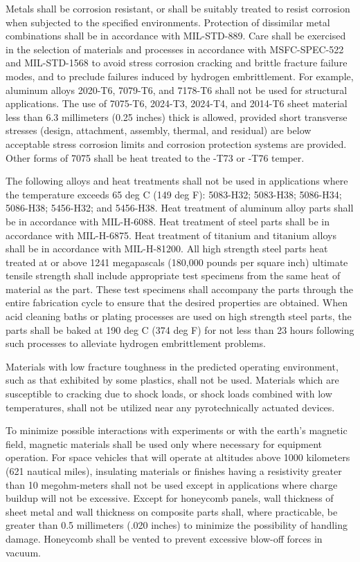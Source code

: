 \documentclass[12pt]{article}
\begin{document}
Metals shall be corrosion resistant, or shall be suitably treated to resist corrosion when subjected to the specified environments. 
Protection of dissimilar metal combinations shall be in accordance with MIL-STD-889. 
Care shall be exercised in the selection of materials and processes in accordance with MSFC-SPEC-522 and MIL-STD-1568 to avoid stress corrosion cracking and brittle fracture failure modes, and to preclude failures induced by hydrogen embrittlement. 
For example, aluminum alloys 2020-T6, 7079-T6, and 7178-T6 shall not be used for structural applications. 
The use of 7075-T6, 2024-T3, 2024-T4, and 2014-T6 sheet material less than 6.3 millimeters (0.25 inches) thick is allowed, provided short transverse stresses (design, attachment, assembly, thermal, and residual) are below acceptable stress corrosion limits and corrosion protection systems are provided. 
Other forms of 7075 shall be heat treated to the -T73 or -T76 temper.

The following alloys and heat treatments shall not be used in applications where the temperature exceeds 65 deg C (149 deg F): 5083-H32; 5083-H38; 5086-H34; 5086-H38; 5456-H32; and 5456-H38. 
Heat treatment of aluminum alloy parts shall be in accordance with MIL-H-6088. 
Heat treatment of steel parts shall be in accordance with MIL-H-6875. 
Heat treatment of titanium and titanium alloys shall be in accordance with MIL-H-81200.
All high strength steel parts heat treated at or above 1241 megapascals (180,000 pounds per square inch) ultimate tensile strength shall include appropriate test specimens from the same heat of material as the part. 
These test specimens shall accompany the parts through the entire fabrication cycle to ensure that the desired properties are obtained. 
When acid cleaning baths or plating processes are used on high strength steel parts, the parts shall be baked at 190 deg C (374 deg F) for not less than 23 hours following such processes to alleviate hydrogen embrittlement problems.

Materials with low fracture toughness in the predicted operating environment, such as that exhibited by some plastics, shall not be used. 
Materials which are susceptible to cracking due to shock loads, or shock loads combined with low temperatures, shall not be utilized near any pyrotechnically actuated devices.

To minimize possible interactions with experiments or with the earth's magnetic field, magnetic materials shall be used only where necessary for equipment operation. 
For space vehicles that will operate at altitudes above 1000 kilometers (621 nautical miles), insulating materials or finishes having a resistivity greater than 10 megohm-meters shall not be used except in applications where charge buildup will not be excessive. 
Except for honeycomb panels, wall thickness of sheet metal and wall thickness on composite parts shall, where practicable, be greater than 0.5 millimeters (.020 inches) to minimize the possibility of handling damage. 
Honeycomb shall be vented to prevent excessive blow-off forces in vacuum.
\end{document}
